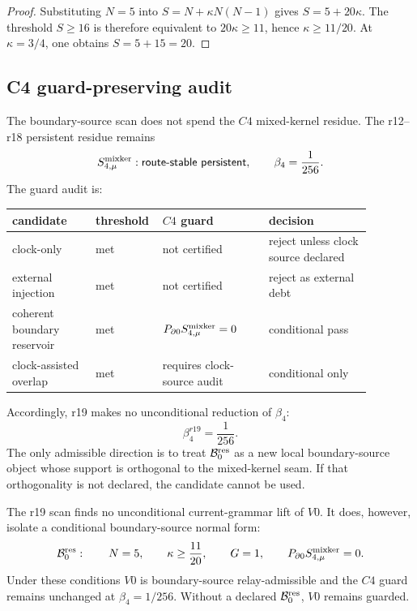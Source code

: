 \begin{proof}
Substituting \(N=5\) into \(S=N+\kappa N(N-1)\) gives
\(S=5+20\kappa\).  The threshold \(S\ge16\) is therefore equivalent to
\(20\kappa\ge11\), hence \(\kappa\ge 11/20\).  At \(\kappa=3/4\), one obtains
\(S=5+15=20\).
\end{proof}

\subsection{C4 guard-preserving audit}
\label{subsec:v470-r19-c4-guard-preserving-audit}

The boundary-source scan does not spend the \(C4\) mixed-kernel residue.  The
r12--r18 persistent residue remains
\[
S_{4,\mu}^{\rm mixker}:\mathsf{route\mbox{-}stable\ persistent},
\qquad
\beta_4=\frac1{256}.
\]
The guard audit is:
\begin{center}
\begin{tabular}{@{}>{\raggedright\arraybackslash}p{0.22\linewidth}>{\raggedright\arraybackslash}p{0.11\linewidth}>{\raggedright\arraybackslash}p{0.28\linewidth}>{\raggedright\arraybackslash}p{0.27\linewidth}@{}}
candidate & threshold & \(C4\)  guard & decision\\
\hline
clock-only & met & not certified & reject unless clock source declared\\
external injection & met & not certified & reject as external debt\\
coherent boundary reservoir & met & \(P_{\partial0}S_{4,\mu}^{\rm mixker}=0\) & conditional pass\\
clock-assisted overlap & met & requires clock-source audit & conditional only\\
\end{tabular}
\end{center}
Accordingly, r19 makes no unconditional reduction of \(\beta_4\):
\[
\boxed{
\beta_4^{r19}=\frac1{256}.
}
\]
The only admissible direction is to treat \(\mathcal B_0^{\rm res}\) as a new
local boundary-source object whose support is orthogonal to the mixed-kernel
seam.  If that orthogonality is not declared, the candidate cannot be used.

\begin{proposition}
\label{prop:v470-r19-guard-preserving-outcome}
The r19 scan finds no unconditional current-grammar lift of \(V0\).  It does,
however, isolate a conditional boundary-source normal form:
\[
\mathcal B_0^{\rm res}:
\qquad
N=5,
\qquad
\kappa\ge\frac{11}{20},
\qquad
G=1,
\qquad
P_{\partial0}S_{4,\mu}^{\rm mixker}=0.
\]
Under these conditions \(V0\) is boundary-source relay-admissible and the
\(C4\) guard remains unchanged at \(\beta_4=1/256\).  Without a declared
\(\mathcal B_0^{\rm res}\), \(V0\) remains guarded.
\end{proposition}

